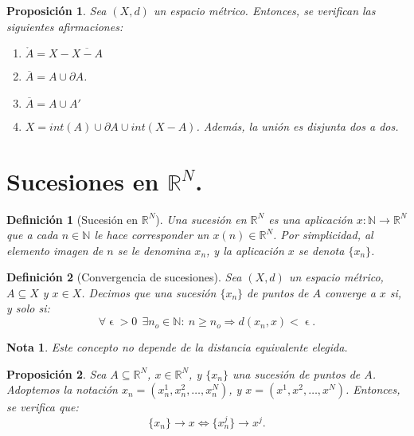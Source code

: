 \documentclass[11pt, a4paper, titlepage]{article}
\let\epsilon\upvarepsilon
\theoremstyle{theorem-style}
\newtheorem*{nprop}{Proposición}
\theoremstyle{definition-style}
\newtheorem*{ndef}{Definición}
\theoremstyle{remark-style}
\newtheorem*{nota}{Nota}
\theoremstyle{example-style}
\newenvironment{nlist}
{\begin{enumerate}
\renewcommand\labelenumi{(\emph{\roman{enumi})}}}
{\end{enumerate}}
\begin{document}
\begin{nprop}
Sea $(X,d)$ un espacio métrico. Entonces, se verifican las siguientes afirmaciones:

\begin{nlist}
\item $\mathring{A} = X - \overline{X-A}$

\item $\overline{A} = A \cup \partial A$.

\item $\overline{A} = A \cup A'$

\item $X = int(A) \cup \partial A \cup int(X-A)$. Además, la unión es disjunta dos a dos.
\end{nlist}

\end{nprop}

\newpage


\section{Sucesiones en $\mathbb{R}^N$.}



\begin{ndef}[Sucesión en $\mathbb{R}^N$]
Una sucesión en $\mathbb{R}^N$ es una aplicación $x: \mathbb{N} \longrightarrow \mathbb{R}^N$ que a cada $n\in \mathbb{N}$ le hace corresponder un $x(n) \in \mathbb{R}^N$. Por simplicidad, al elemento imagen de $n$ se le denomina $x_n$, y la aplicación $x$ se denota $\{x_n\}$.
\end{ndef}



\begin{ndef}[Convergencia de sucesiones]
Sea $(X,d)$ un espacio métrico, $A\subseteq X$ y $x\in X$. Decimos que una sucesión $\{x_n\}$ de puntos de $A$ converge a $x$ si, y solo si: $$ \forall \epsilon > 0\ \ \exists n_o \in \mathbb{N}: \ n\ge n_o \Rightarrow d(x_n,x) < \epsilon.$$
\end{ndef}



\begin{nota}
Este concepto no depende de la distancia equivalente elegida.
\end{nota}



\begin{nprop}
Sea $A\subseteq \mathbb{R}^N$, $x\in \mathbb{R}^N$, y $\{x_n\}$ una sucesión de puntos de $A$. Adoptemos la notación $x_n = (x_n^1, x_n^2,\dots,x_n^N)$, y $x=(x^1, x^2,\dots, x^N)$. Entonces, se verifica que:
$$\{x_n\} \rightarrow x \iff \{x_n^j\} \rightarrow x^j.$$
\end{nprop}
\end{document}
